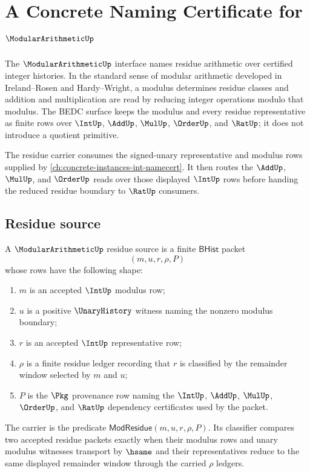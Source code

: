 \chapter{A Concrete Naming Certificate for $\ModularArithmeticUp$}
\label{ch:concrete-instances-modulararithmetic}

The $\ModularArithmeticUp$ interface names residue arithmetic over certified integer histories. In the standard sense of modular arithmetic developed in Ireland--Rosen and Hardy--Wright, a modulus determines residue classes and addition and multiplication are read by reducing integer operations modulo that modulus. The BEDC surface keeps the modulus and every residue representative as finite rows over $\IntUp$, $\AddUp$, $\MulUp$, $\OrderUp$, and $\RatUp$; it does not introduce a quotient primitive.

The residue carrier consumes the signed-unary representative and modulus rows supplied by \autoref{ch:concrete-instances-int-namecert}. It then routes the $\AddUp$, $\MulUp$, and $\OrderUp$ reads over those displayed $\IntUp$ rows before handing the reduced residue boundary to $\RatUp$ consumers.

\section{Residue source}
\label{sec:modulararithmetic-residue-source}

\begin{definition}
\label{def:modulararithmetic-residue-source}
A $\ModularArithmeticUp$ residue source is a finite $\mathsf{BHist}$ packet
$$
(m,u,r,\rho,P)
$$
whose rows have the following shape:
\begin{enumerate}
\item $m$ is an accepted $\IntUp$ modulus row;
\item $u$ is a positive $\UnaryHistory$ witness naming the nonzero modulus boundary;
\item $r$ is an accepted $\IntUp$ representative row;
\item $\rho$ is a finite residue ledger recording that $r$ is classified by the remainder window selected by $m$ and $u$;
\item $P$ is the $\Pkg$ provenance row naming the $\IntUp$, $\AddUp$, $\MulUp$, $\OrderUp$, and $\RatUp$ dependency certificates used by the packet.
\end{enumerate}
The carrier is the predicate $\mathsf{ModResidue}(m,u,r,\rho,P)$. Its classifier compares two accepted residue packets exactly when their modulus rows and unary modulus witnesses transport by $\hsame$ and their representatives reduce to the same displayed remainder window through the carried $\rho$ ledgers.
\end{definition}

